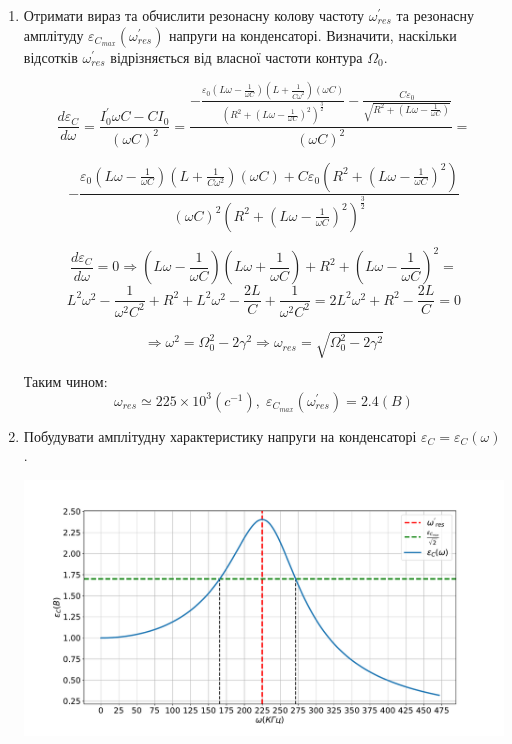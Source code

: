 \documentclass[a4paper, 12pt]{article}
\begin{document}
\begin{enumerate}
    \item Отримати вираз та обчислити резонасну колову частоту $\omega_{res}^{'}$ та
    резонасну амплітуду $\varepsilon_{C_{max}}(\omega_{res}^{'})$ напруги на конденсаторі.
    Визначити, наскільки відсотків $\omega_{res}^{'}$ відрізняється від власної частоти контура $\Omega_0$.
    
    $$ \frac{d \varepsilon_C}{d\omega} = \frac{I_0^{'} \omega C - C I_0}{(\omega C)^2} = 
    \frac{-\frac{\varepsilon_0 \left( L \omega - \frac{1}{\omega C} \right) \left( L + \frac{1}{C \omega^2} \right) \left( \omega C  \right)}
    { \left(R^2 + \left( L \omega - \frac{1}{\omega C} \right)^2 \right)^{\frac{3}{2}} } - \frac{C \varepsilon_0}{\sqrt{R^2 + \left( L \omega - \frac{1}{\omega C} \right)}} } {\left( \omega C \right)^2} = $$
    
    $$ - \frac{\varepsilon_0 \left( L \omega - \frac{1}{\omega C} \right) \left( L + \frac{1}{C \omega^2} \right) \left( \omega C  \right) + C \varepsilon_0 \left(R^2 + \left( L \omega - \frac{1}{\omega C} \right)^2 \right) }
    {\left( \omega C \right)^2 \left(R^2 + \left( L \omega - \frac{1}{\omega C} \right)^2 \right)^{\frac{3}{2}}} $$
    
    $$ \frac{d \varepsilon_C}{d\omega} = 0 \Rightarrow 
    \left( L \omega - \frac{1}{\omega C} \right) \left( L \omega + \frac{1}{\omega C} \right) +
    R^2 + \left( L \omega - \frac{1}{\omega C} \right)^2 = $$ 
    $$ L^2 \omega^2 - \frac{1}{\omega^2 C^2} + R^2 + L^2 \omega^2 - \frac{2L}{C} + \frac{1}{\omega^2 C^2} =
    2 L^2 \omega^2 + R^2 - \frac{2L}{C} = 0 $$ 
    
    $$ \Rightarrow \omega^2 = \Omega_0^2 - 2\gamma^2 \Rightarrow \omega_{res} = \sqrt{\Omega_0^2 - 2\gamma^2} $$
    
    Таким чином:
    $$ \omega_{res} \simeq 225\times10^3(c^{-1}),\; \varepsilon_{C_{max}}(\omega_{res}^{'}) = 2.4(B)$$

    \item Побудувати амплітудну характеристику напруги на конденсаторі $\varepsilon_C = \varepsilon_C(\omega)$.
    
    \includegraphics[width=1.0\textwidth]{graphics/EC(w).pdf}


\end{enumerate}
\end{document}
